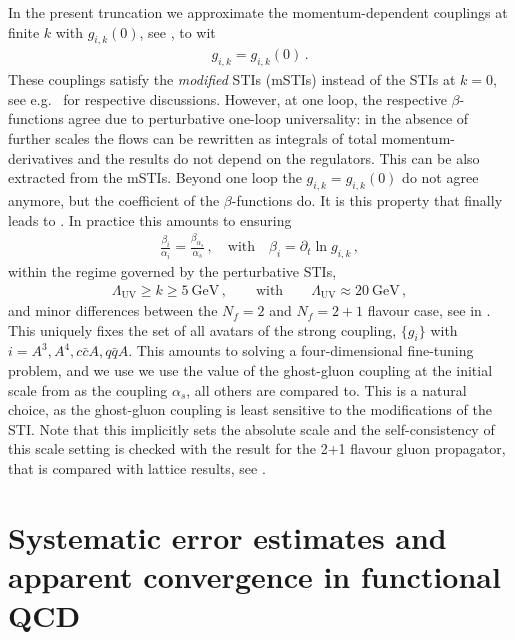 \documentclass[aps,twocolumn,prd,superscriptaddress]{revtex4-2}
\begin{document}
In the present truncation we approximate the momentum-dependent couplings at finite $k$ with $g_{i,k}(0)$, see , to wit 
%
\begin{align}
	g_{i,k} = g_{i,k}(0)\,.
	\label{eq:defofgs}
\end{align}
%
These couplings satisfy the \textit{modified} STIs (mSTIs) instead of the STIs at $k=0$, see e.g.~\cite{Cyrol:2017ewj,Pawlowski:2022oyq} for respective discussions. However, at one loop, the respective $\beta$-functions agree due to perturbative one-loop universality: in the absence of further scales the flows can be rewritten as integrals of total momentum-derivatives and the results do not depend on the regulators. This can be also extracted from the mSTIs. Beyond one loop the $g_{i,k}=g_{i,k}(0)$ do not agree anymore, but the coefficient of the $\beta$-functions do. It is this property that finally leads to . In practice this amounts to ensuring 
%
\begin{align} 
	\frac{\beta_i}{\alpha_i} =\frac{\beta_{\alpha_s}}{{\alpha_s}} \,,\quad \textrm{with}\quad \beta_i = \partial_t \ln g_{i,k} \,, 
	\label{eq:beta_iEqual}
\end{align}
%
within the regime governed by the perturbative STIs, 
%
\begin{align} 
	\Lambda_\textrm{UV} \geq k \geq \qty{5}{\GeV}\,,\qquad \textrm{with}\qquad \Lambda_\textrm{UV} \approx \qty{20}{\GeV}\,,
	\label{eq:STIRange}
\end{align}
%
and minor differences between the $N_f=2$ and $N_f=2+1$ flavour case, see  in . This uniquely fixes the set of all avatars of the strong coupling, $\{g_i\}$ with $i=A^3, A^4, c\bar cA,q\bar q A$. This amounts to solving a four-dimensional fine-tuning problem, and we use we use the value of the ghost-gluon coupling at the initial scale from \cite{Cyrol:2017ewj} as the coupling $\alpha_s$, all others are compared to. This is a natural choice, as the ghost-gluon coupling is least sensitive to the modifications of the STI. Note that this implicitly sets the absolute scale and the self-consistency of this scale setting is checked with the result for the 2+1 flavour gluon propagator, that is compared with lattice results, see . 


\section{Systematic error estimates and apparent convergence in functional QCD}
\label{sec:ApparentConvergence}
\end{document}
